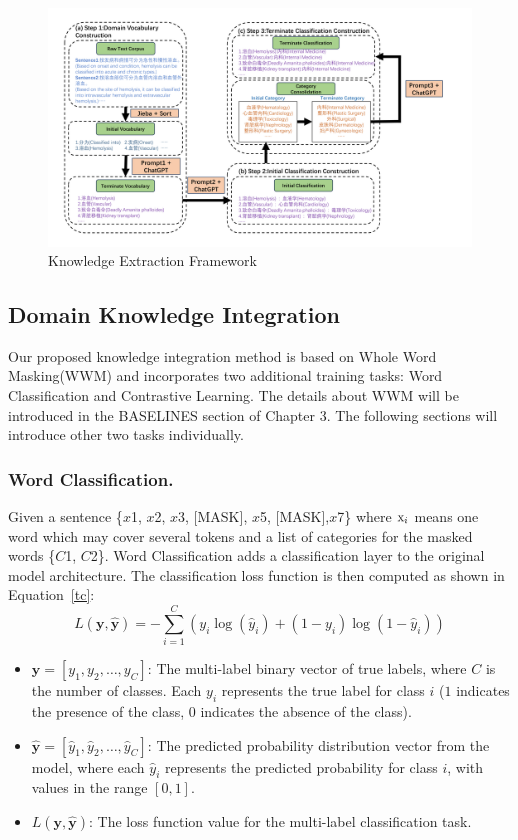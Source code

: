 \begin{figure}[ht]
	\centering
	\includegraphics[width=1.0\textwidth]{ChatGPT} 
	\caption{Knowledge Extraction Framework}
	\label{ke}
\end{figure}
\subsection{Domain Knowledge Integration}
Our proposed knowledge integration method is based on Whole Word Masking(WWM)\cite{macbert} and incorporates two additional training tasks: Word Classification and Contrastive Learning. The details about WWM will be introduced in the BASELINES section of Chapter 3. The following sections will introduce other two tasks individually.
\subsubsection{Word Classification.}
Given a sentence \{$x${\tiny 1}, $x${\tiny 2}, $x${\tiny 3}, [MASK], $x${\tiny 5}, [MASK],$x${\tiny 7}\} where \($x$_i\) means one word which may cover several tokens and a list of categories for the masked words \{$C${\tiny 1}, $C${\tiny 2}\}. Word Classification adds a classification layer to the original model architecture. The classification loss function is then computed as shown in Equation~\ref{tc}:
\begin{equation}
	\label{tc}
	L(\mathbf{y}, \mathbf{\hat{y}}) = - \sum_{i=1}^C \left( y_i \log(\hat{y}_i) + (1 - y_i) \log(1 - \hat{y}_i) \right)
\end{equation}
\begin{itemize}
	\item $\mathbf{y} = [y_1, y_2, \ldots, y_C]$: The multi-label binary vector of true labels, where $C$ is the number of classes. Each $y_i$ represents the true label for class $i$ ($1$ indicates the presence of the class, $0$ indicates the absence of the class).
	\item $\mathbf{\hat{y}} = [\hat{y}_1, \hat{y}_2, \ldots, \hat{y}_C]$: The predicted probability distribution vector from the model, where each $\hat{y}_i$ represents the predicted probability for class $i$, with values in the range $[0, 1]$.
	\item $L(\mathbf{y}, \mathbf{\hat{y}})$: The loss function value for the multi-label classification task.
\end{itemize}
